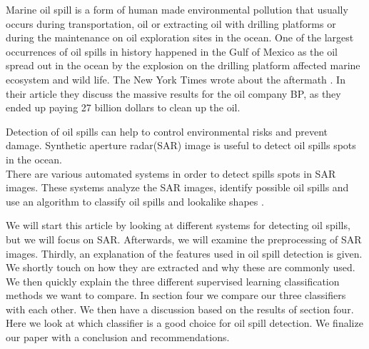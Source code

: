 Marine oil spill is a form of human made environmental pollution that usually occurs during transportation, oil or extracting oil with drilling platforms \cite{Zhang201476} or during the maintenance on oil exploration sites in the ocean. One of the largest occurrences of oil spills in history happened in the Gulf of Mexico as the oil spread out in the ocean by the explosion on the drilling platform affected marine ecosystem and wild life\cite{Bozeman2011244}. The New York Times wrote about the aftermath \cite{bpnytimes}. In their article they discuss the massive results for the oil company BP, as they ended up paying 27 billion dollars to clean up the oil.

Detection of oil spills can help to control environmental risks and prevent damage. Synthetic aperture radar(SAR) image is useful to detect oil spills spots in the ocean. \\
There are various automated systems in order to detect spills spots in SAR images. These systems analyze the SAR images, identify possible oil spills and use an algorithm to classify oil spills and lookalike shapes \cite{Xu201414,brekke2008classifiers,Keramitsoglou2006640,Guo2014146}.

We will start this article by looking at different systems for detecting oil spills, but we will focus on SAR. Afterwards, we will examine the preprocessing of SAR images. Thirdly, an explanation of the features used in oil spill detection is given. We shortly touch on how they are extracted and why these are commonly used. We then quickly explain the three different supervised learning classification methods we want to compare. In section four we compare our three classifiers with each other. We then have a discussion based on the results of section four. Here we look at which classifier is a good choice for oil spill detection. We finalize our paper with a conclusion and recommendations.
